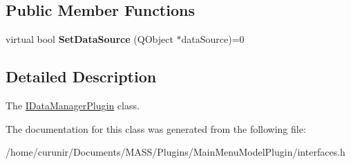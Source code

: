 \subsection*{Public Member Functions}
\begin{DoxyCompactItemize}
\item 
virtual bool {\bfseries Set\+Data\+Source} (Q\+Object $\ast$data\+Source)=0\hypertarget{class_i_data_manager_plugin_ad9a6a153bc6fe2c64b0a4ee2013fb149}{}\label{class_i_data_manager_plugin_ad9a6a153bc6fe2c64b0a4ee2013fb149}

\end{DoxyCompactItemize}


\subsection{Detailed Description}
The \hyperlink{class_i_data_manager_plugin}{I\+Data\+Manager\+Plugin} class. 

The documentation for this class was generated from the following file\+:\begin{DoxyCompactItemize}
\item 
/home/curunir/\+Documents/\+M\+A\+S\+S/\+Plugins/\+Main\+Menu\+Model\+Plugin/interfaces.\+h\end{DoxyCompactItemize}
